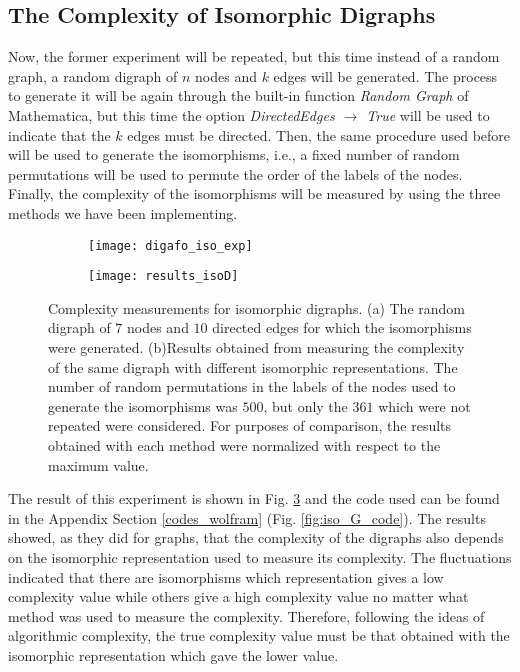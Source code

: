 \subsection{The Complexity of Isomorphic Digraphs}
Now, the former experiment will be repeated, but this time instead of a random graph, a random digraph of $n$ nodes and $k$ edges will be generated. The process to generate it will be again through the built-in function \textit{Random Graph} of Mathematica, but this time the option \textit{DirectedEdges $\rightarrow$ True} will be used to indicate that the $k$ edges must be directed. Then, the same procedure used before will be used to generate the isomorphisms, i.e., a fixed number of random permutations will be used to permute the order of the labels of the nodes. Finally, the complexity of the isomorphisms will be measured by using the three methods we have been implementing.\\

\begin{figure}
	\centering
	\begin{subfigure}[b]{0.49\textwidth}
		\centering
		\texttt{[image: digafo\_iso\_exp]}
		\caption{}
		\label{fig:digafo_iso_exp}
	\end{subfigure}
	\hspace{0.5mm}
	\begin{subfigure}[b]{0.49\textwidth}
		\centering
		\texttt{[image: results\_isoD]}
		\caption{}
		\label{fig:results_isoD}
	\end{subfigure}
	\caption[Complexity measurements for isomorphic digraphs.]{Complexity measurements for isomorphic digraphs. (a) The random digraph of $7$ nodes and $10$ directed edges for which the isomorphisms were generated. (b)Results obtained from measuring the complexity of the same digraph with different isomorphic representations. The number of random permutations in the labels of the nodes used to generate the isomorphisms was $500$, but only the $361$ which were not repeated were considered. For purposes of comparison, the results obtained with each method were normalized with respect to the maximum value.}
	\label{fig:iso_D_complex_results}
\end{figure}

The result of this experiment is shown in Fig. \ref{fig:iso_D_complex_results} and the code used can be found in the Appendix Section \ref{codes_wolfram} (Fig. \ref{fig:iso_G_code}). The results showed, as they did for graphs, that the complexity of the digraphs also depends on the isomorphic representation used to measure its complexity. The fluctuations indicated that there are isomorphisms which representation gives a low complexity value while others give a high complexity value no matter what method was used to measure the complexity. Therefore, following the ideas of algorithmic complexity, the true complexity value must be that obtained with the isomorphic representation which gave the lower value.\\

